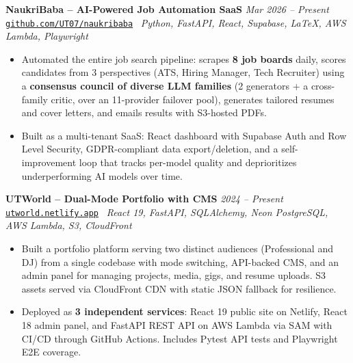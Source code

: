 \documentclass[10pt,a4paper]{article}
\newcommand{\projectentryurl}[5]{%
  \Needspace{3\baselineskip}%
  \textbf{#1} \hfill \textit{#2}\\[-0.15em]
  {\small\href{#3}{\texttt{#4}}} \textbar\ \textit{#5}\\[-0.25em]
}
\begin{document}
\vspace{0.20em}
\projectentryurl{NaukriBaba -- AI-Powered Job Automation SaaS}{Mar 2026 -- Present}{https://github.com/UT07/naukribaba}{github.com/UT07/naukribaba}{Python, FastAPI, React, Supabase, LaTeX, AWS Lambda, Playwright}
\begin{itemize}
  \item Automated the entire job search pipeline: scrapes \textbf{8 job boards} daily, scores candidates from 3 perspectives (ATS, Hiring Manager, Tech Recruiter) using a \textbf{consensus council of diverse LLM families} (2 generators + a cross-family critic, over an 11-provider failover pool), generates tailored resumes and cover letters, and emails results with S3-hosted PDFs.
  \item Built as a multi-tenant SaaS: React dashboard with Supabase Auth and Row Level Security, GDPR-compliant data export/deletion, and a self-improvement loop that tracks per-model quality and deprioritizes underperforming AI models over time.
\end{itemize}
\vspace{0.20em}
\projectentryurl{UTWorld -- Dual-Mode Portfolio with CMS}{2024 -- Present}{https://utworld.netlify.app}{utworld.netlify.app}{React 19, FastAPI, SQLAlchemy, Neon PostgreSQL, AWS Lambda, S3, CloudFront}
\begin{itemize}
  \item Built a portfolio platform serving two distinct audiences (Professional and DJ) from a single codebase with mode switching, API-backed CMS, and an admin panel for managing projects, media, gigs, and resume uploads. S3 assets served via CloudFront CDN with static JSON fallback for resilience.
  \item Deployed as \textbf{3 independent services}: React 19 public site on Netlify, React 18 admin panel, and FastAPI REST API on AWS Lambda via SAM with CI/CD through GitHub Actions. Includes Pytest API tests and Playwright E2E coverage.
\end{itemize}
\end{document}
